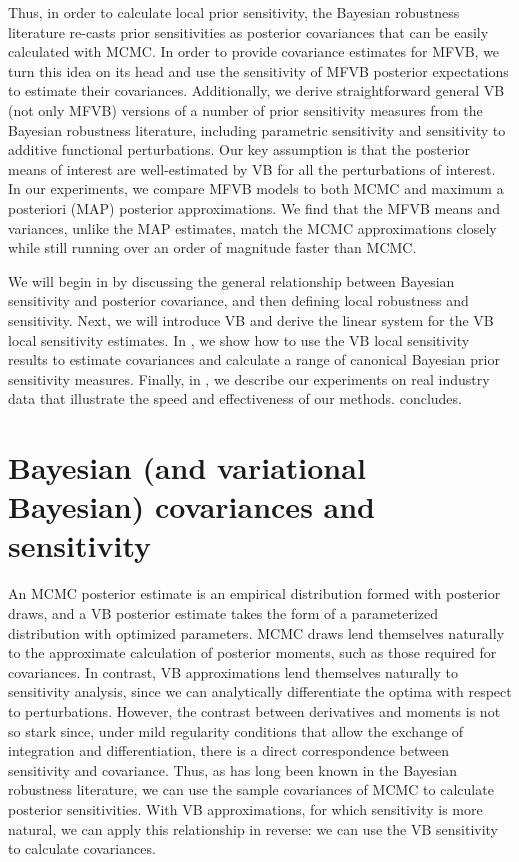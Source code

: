 \documentclass{article}\usepackage[]{graphicx}\usepackage[]{color}
\theoremstyle{plain}
\theoremstyle{definition}
\theoremstyle{plain}
\theoremstyle{plain}
\theoremstyle{plain}
\theoremstyle{plain}
\begin{document}
Thus, in order to calculate local prior sensitivity, the Bayesian
robustness literature re-casts prior sensitivities as posterior covariances
that can be easily calculated with MCMC. In order to provide covariance
estimates for MFVB, we turn this idea on its head and use the sensitivity
of MFVB posterior expectations to estimate their covariances. Additionally,
we derive straightforward general VB (not only MFVB) versions of a
number of prior sensitivity measures from the Bayesian robustness
literature, including parametric sensitivity and sensitivity to additive
functional perturbations. Our key assumption is that the posterior
means of interest are well-estimated by VB for all the perturbations
of interest. In our experiments, we compare MFVB models to both MCMC
and maximum a posteriori (MAP) posterior approximations. We find that
the MFVB means and variances, unlike the MAP estimates, match the
MCMC approximations closely while still running over an order of magnitude
faster than MCMC.

We will begin in  by discussing the general
relationship between Bayesian sensitivity and posterior covariance,
and then defining local robustness and sensitivity. Next, we will
introduce VB and derive the linear system for the VB local sensitivity
estimates. In , we show how
to use the VB local sensitivity results to estimate covariances and
calculate a range of canonical Bayesian prior sensitivity measures.
Finally, in , we describe our experiments
on real industry data that illustrate the speed and effectiveness
of our methods.  concludes.

\section{Bayesian (and variational Bayesian) covariances and sensitivity\label{sec:theory}}

An MCMC posterior estimate is an empirical distribution formed with
posterior draws, and a VB posterior estimate takes the form of a parameterized
distribution with optimized parameters. MCMC draws lend themselves
naturally to the approximate calculation of posterior moments, such
as those required for covariances. In contrast, VB approximations
lend themselves naturally to sensitivity analysis, since we can analytically
differentiate the optima with respect to perturbations. However, the
contrast between derivatives and moments is not so stark since, under
mild regularity conditions that allow the exchange of integration
and differentiation, there is a direct correspondence between sensitivity
and covariance. Thus, as has long been known in the Bayesian robustness
literature, we can use the sample covariances of MCMC to calculate
posterior sensitivities. With VB approximations, for which sensitivity
is more natural, we can apply this relationship in reverse: we can
use the VB sensitivity to calculate covariances.
\end{document}
